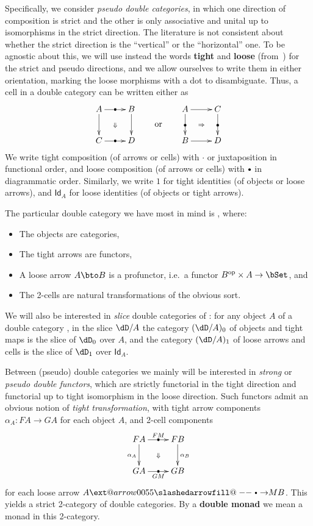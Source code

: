 \documentclass{amsart}
\makeatletter
\def\rightbulletarrowfill@{%
  \slashedarrowfill@\relbar\relbar{\raisebox{1.25pt}{$\scriptscriptstyle\bullet$}}\rightarrow}
\newcommand\xbulletrightarrow[2][]{%
  \ext@arrow 0055{\rightbulletarrowfill@}{#1}{#2}}
\let\xbto\xbulletrightarrow
\let\tc\cdot
\newcommand{\bc}{\mathbin{\raisebox{1pt}{\scriptsize$\bullet$}}}
\newcommand{\hunit}[1]{\Id_{#1}}
\newcommand{\Id}{\mathsf{Id}}
\makeatother
\begin{document}
Specifically, we consider \emph{pseudo double categories}, in which one direction of composition is strict and the other is only associative and unital up to isomorphisms in the strict direction.
The literature is not consistent about whether the strict direction is the ``vertical'' or the ``horizontal'' one.
To be agnostic about this, we will use instead the words \textbf{tight} and \textbf{loose} (from~\cite{ls:limlax}) for the strict and pseudo directions, and we allow ourselves to write them in either orientation, marking the loose morphisms with a dot to disambiguate.
Thus, a cell in a double category can be written either as
\[ \vcenter{\xymatrix{ A \ar[r]|{\bullet} \ar[d] \ar@{}[dr]|{\Downarrow}& B \ar[d] \\ C \ar[r]|{\bullet} & D } }
\qquad\text{or}\qquad
\vcenter{\xymatrix{ A \ar[d]|{\bullet} \ar[r] \ar@{}[dr]|{\Rightarrow}& C \ar[d]|{\bullet} \\ B \ar[r] & D } }
\]
We write tight composition (of arrows or cells) with $\tc$ or juxtaposition in functional order, and loose composition (of arrows or cells) with $\bc$ in diagrammatic order.
Similarly, we write $1$ for tight identities (of objects or loose arrows), and $\hunit{A}$ for loose identities (of objects or tight arrows).

The particular double category we have most in mind is \dCat, where:
\begin{itemize}
\item The objects are categories,
\item The tight arrows are functors,
\item A loose arrow $A\bto B$ is a profunctor, i.e.\ a functor $B\op\times A\to\bSet$, and
\item The 2-cells are natural transformations of the obvious sort.
\end{itemize}
We will also be interested in \emph{slice} double categories of \dCat: for any object $A$ of a double category \dD, in the slice $\dD/A$ the category $(\dD/A)_0$ of objects and tight maps is the slice of $\dD_0$ over $A$, and the category $(\dD/A)_1$ of loose arrows and cells is the slice of $\dD_1$ over $\hunit A$.

Between (pseudo) double categories we mainly will be interested in \emph{strong} or \emph{pseudo double functors}, which are strictly functorial in the tight direction and functorial up to tight isomorphism in the loose direction.
Such functors admit an obvious notion of \emph{tight transformation}, with tight arrow components $\alpha_A:FA\to GA$ for each object $A$, and 2-cell components
\[ \vcenter{\xymatrix{ FA \ar[r]|{\bullet}^{FM} \ar[d]_{\alpha_A} \ar@{}[dr]|{\Downarrow}& FB \ar[d]^{\alpha_B} \\ GA \ar[r]|{\bullet}_{GM} & GB } } \]
for each loose arrow $A\xbto{M} B$.
This yields a strict 2-category of double categories.
By a \textbf{double monad} we mean a monad in this 2-category.
\end{document}
